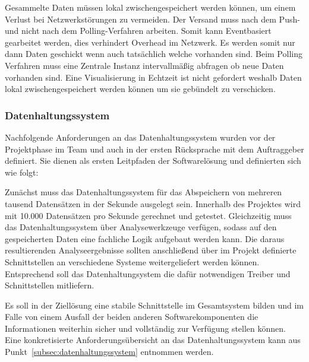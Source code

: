 Gesammelte Daten müssen lokal zwischengespeichert werden können, um einem
Verlust bei Netzwerkstörungen zu vermeiden. Der Versand muss nach dem Push- und
nicht nach dem Polling-Verfahren arbeiten. Somit kann Eventbasiert gearbeitet
werden, dies verhindert Overhead im Netzwerk. Es werden somit nur dann Daten
geschickt wenn auch tatsächlich welche vorhanden sind. Beim Polling Verfahren
muss eine Zentrale Instanz intervallmäßig abfragen ob neue Daten vorhanden
sind. Eine Visualisierung in Echtzeit ist nicht gefordert weshalb Daten lokal
zwischengespeichert werden können um sie gebündelt zu verschicken.
\tm%

\subsubsection{Datenhaltungssystem}
Nachfolgende Anforderungen an das Datenhaltungssystem wurden vor der
Projektphase im Team und auch in der ersten Rücksprache mit dem Auftraggeber
definiert. Sie dienen als ersten Leitpfaden der Softwarelösung und definierten
sich wie folgt:

\begin{outline}
  \1 Zunächst muss das Datenhaltungssystem für das Abspeichern von mehreren
  tausend Datensätzen in der Sekunde ausgelegt sein. Innerhalb des Projektes
  wird mit 10.000 Datensätzen pro Sekunde gerechnet und getestet.
  \1 Gleichzeitig muss das Datenhaltungssystem über Analysewerkzeuge verfügen,
  sodass auf den gespeicherten Daten eine fachliche Logik aufgebaut werden
  kann.
  \1 Die daraus resultierenden Analyseergebnisse sollten anschließend über im
  Projekt definierte Schnittstellen an verschiedene Systeme weitergeliefert
  werden können. Entsprechend soll das Datenhaltungsystem die dafür
  notwendigen Treiber und Schnittstellen mitliefern.
\end{outline}

Es soll in der Ziellösung eine stabile Schnittstelle im Gesamtsystem bilden
und im Falle von einem Ausfall der beiden anderen Softwarekomponenten die
Informationen weiterhin sicher und vollständig zur Verfügung stellen können.
Eine konkretisierte Anforderungsübersicht an das Datenhaltungssystem kann aus
Punkt~\ref{subsec:datenhaltungssystem} entnommen werden.
\nl%

